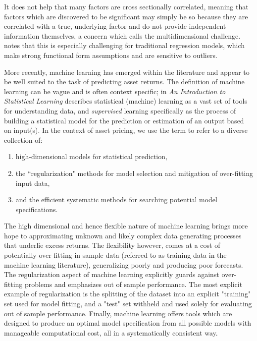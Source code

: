 \documentclass[a4paper, table]{article}
\begin{document}
It does not help that many factors are cross sectionally correlated, meaning that factors which are discovered to be significant may simply be so because they are correlated with a true, underlying factor and do not provide independent information themselves, a concern which \cite{cochrane_presidential_2011} calls the multidimensional challenge. \cite{freyberger_dissecting_2017} notes that this is especially challenging for traditional regression models, which make strong functional form assumptions and are sensitive to outliers. 

More recently, machine learning has emerged within the literature and appear to be well suited to the task of predicting asset returns. The definition of machine learning can be vague and is often context specific; \cite{hastie_elements_2009} in \textit{An Introduction to Statistical Learning} describes statistical (machine) learning as a vast set of tools for understanding data, and \textit{supervised} learning specifically as the process of building a statistical model for the prediction or estimation of an output based on input(s). In the context of asset pricing, we use the term to refer to a diverse collection of:

\begin{enumerate}
	\item high-dimensional models for statistical prediction, 
	\item the ``regularization" methods for model selection and mitigation of over-fitting input data, 
	\item and the efficient systematic methods for searching potential model specifications.
\end{enumerate}

The high dimensional and hence flexible nature of machine learning brings more hope to approximating unknown and likely complex data generating processes that underlie excess returns. The flexibility however, comes at a cost of potentially over-fitting in sample data (referred to as training data in the machine learning literature), generalizing poorly and producing poor forecasts. The regularization aspect of machine learning explicitly guards against over-fitting problems and emphasizes out of sample performance. The most explicit example of regularization is the splitting of the dataset into an explicit "training" set used for model fitting, and a "test" set withheld and used solely for evaluating out of sample performance. Finally, machine learning offers tools which are designed to produce an optimal model specification from all possible models with manageable computational cost, all in a systematically consistent way. 
\end{document}
